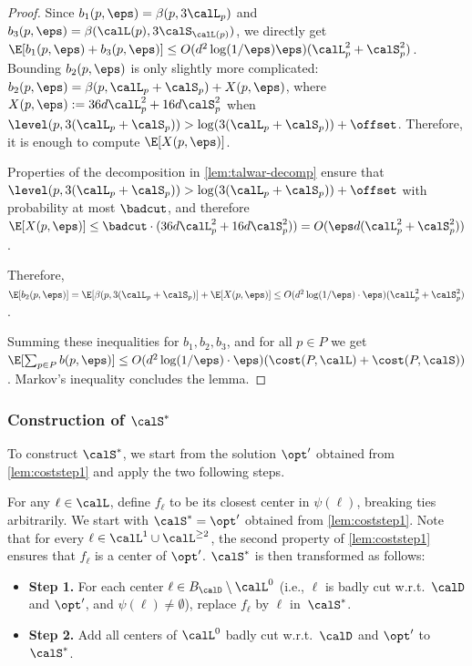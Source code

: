 \begin{proof}
Since $b_1(p, \eps) = \beta(p, 3\calL_p)$ and $b_3(p, \eps) = \beta(\calL(p), 3\calS_{\calL(p)})$, we directly get $\E[b_1(p, \eps) + b_3(p, \eps)] \leq O(d^2 \log(1/\eps) \eps) (\calL_p^2 + \calS_p^2)$. 
Bounding $b_2(p, \eps)$ is only slightly more complicated: $b_2(p, \eps) = \beta(p, \calL_p + \calS_p) + X(p, \eps)$, where $X(p, \eps) := 36  d  \calL_p^2 +  16  d \calS_p^2$ when $\level(p, 3(\calL_p + \calS_p)) > \log(3(\calL_p + \calS_p)) + \offset$. 
Therefore, it is enough to compute $\E[X(p, \eps)]$.

Properties of the decomposition in \cref{lem:talwar-decomp} ensure that $\level(p, 3(\calL_p + \calS_p)) > \log(3(\calL_p + \calS_p)) + \offset$ with probability at most $\badcut$, and therefore $\E[X(p, \eps)] \leq \badcut \cdot (36  d  \calL_p^2 +  16  d \calS_p^2)) = O( \eps d (\calL_p^2 + \calS_p^2))$. 

Therefore, $\E[b_2(p, \eps)] = \E[\beta(p, 3(\calL_p + \calS_p)] + \E[X(p, \eps)] \leq O(d^2 \log(1/\eps) \cdot \eps)(\calL_p^2 + \calS_p^2)$.


Summing these inequalities for $b_1, b_2, b_3$, and for all $p \in P$ we get $\E[\sum_{p \in P} b(p, \eps)] \leq O( d^2  \log(1/\eps) \cdot \eps)(\cost(P, \calL)+ \cost(P, \calS))$. Markov's inequality concludes the lemma. 
\end{proof}

\subsubsection{Construction of $ \calS^*$}

To construct $\calS^*$, we start from the solution $\opt'$ obtained from \cref{lem:coststep1} and apply the two following steps.

For any $\ell \in \calL$, define  $f_\ell$ to be its closest center in $\psi(\ell)$, breaking ties arbitrarily. 
 We 
start with $ \calS^* = \opt'$ obtained from \cref{lem:coststep1}. Note that for every $\ell\in 
 \calL^1 \cup \calL^{\geq 2}$, the second property of \cref{lem:coststep1} ensures that $f_\ell$ is a center of $\opt'$.  $ \calS^*$ is then transformed as follows:
  \begin{itemize}
  \item \textbf{Step 1.} 
    For each center $\ell \in B_\calD\setminus \calL^0$ (i.e., $\ell$ is badly cut w.r.t.\ $\calD$ and $\opt'$, and 
$\psi(\ell)\neq\emptyset$), replace $f_\ell$ by $\ell$ in~$ \calS^*$.
  \item \textbf{Step 2.}
    Add all centers of $ \calL^0$ badly cut w.r.t.\ $\calD$ and $\opt'$ to $ \calS^*$.
  \end{itemize}

